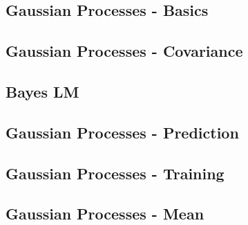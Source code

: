 

\subsection{Gaussian Processes - Basics}

\subsection{Gaussian Processes - Covariance}

\subsection{Bayes LM}

\subsection{Gaussian Processes - Prediction}

\subsection{Gaussian Processes - Training}

\subsection{Gaussian Processes - Mean}

